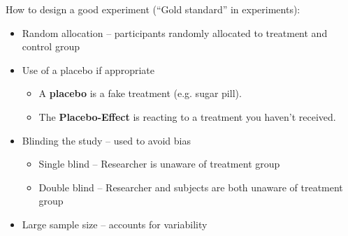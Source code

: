 \documentclass[../mathNotesPreamble]{subfiles}
\begin{document}
  How to design a good experiment (``Gold standard'' in experiments):
  \begin{itemize}
    \item Random allocation -- participants randomly allocated to treatment and control group
    \item Use of a placebo if appropriate 
      \begin{itemize}
        \item A \textbf{placebo} is a fake treatment (e.g. sugar pill).
        \item The \textbf{Placebo-Effect} is reacting to a treatment you haven't received.
      \end{itemize}
    \item Blinding the study  -- used to avoid bias
      \begin{itemize}
        \item Single blind -- Researcher is unaware of treatment group
        \item Double blind -- Researcher and subjects are both unaware of treatment group
      \end{itemize}
    \item Large sample size -- accounts for variability
  \end{itemize}
  \pagebreak
\end{document}
